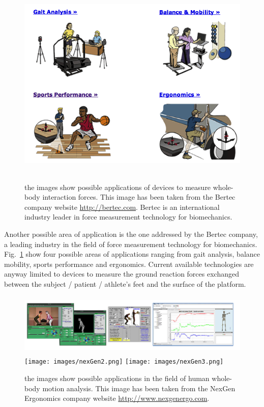 \documentclass[12pt,a4paper,twoside]{article}
\begin{document}
\begin{figure} 
\begin{center}
\includegraphics[height=10cm]{images/bertec.png}
\caption{the images show possible applications of devices to measure whole-body interaction forces. This image has been taken from the Bertec company website \protect\url{http://bertec.com}. Bertec is an international industry leader in force measurement technology for biomechanics.}\label{fig:bertec}
\end{center}
\end{figure}

Another possible area of application is the one addressed by the Bertec company, a leading industry in the field of force measurement technology for biomechanics. Fig.~\ref{fig:bertec} show four possible areas of applications ranging from gait analysis, balance mobility, sports performance and ergonomics. Current available technologies are anyway limited to devices to measure the ground reaction forces exchanged between the subject / patient / athlete’s feet and the surface of the platform. 

\begin{figure}
\begin{center}
\includegraphics[height=3cm]{images/nexGen.png} \texttt{[image: images/nexGen2.png]} \texttt{[image: images/nexGen3.png]}
\caption{the images show possible applications in the field of human whole-body motion analysis. This image has been taken from the NexGen Ergonomics company website \protect\url{http://www.nexgenergo.com}. }\label{fig:nexGen}
\end{center}
\end{figure}
\end{document}
